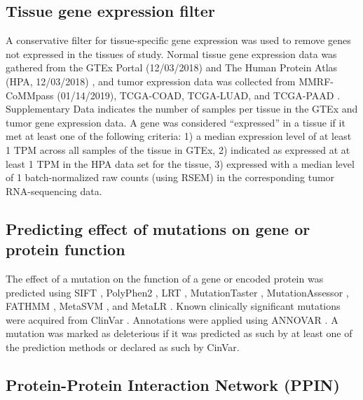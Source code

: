 \documentclass[english, 10pt, letterpaper]{article}
\begin{document}
\subsection*{Tissue gene expression filter}

A conservative filter for tissue-specific gene expression was used to remove genes not expressed in the tissues of study. 
Normal tissue gene expression data was gathered from the GTEx Portal (12/03/2018) \cite{GTExConsortium2017} and The Human Protein Atlas (HPA, 12/03/2018) \cite{Uhlen2015, Uhlen2016}, and tumor expression data was collected from MMRF-CoMMpass (01/14/2019), TCGA-COAD, TCGA-LUAD, and TCGA-PAAD \cite{Walker2019AAnalysis., CancerGenomeAtlasNetwork2012, CancerGenomeAtlasResearchNetwork2014, CancerGenomeAtlasResearchNetwork.Electronicaddress:andrew_aguirredfci.harvard.edu2017}. 
Supplementary Data indicates the number of samples per tissue in the GTEx and tumor gene expression data.
A gene was considered “expressed” in a tissue if it met at least one of the following criteria: 1) a median expression level of at least 1 TPM across all samples of the tissue in GTEx, 2) indicated as expressed at at least 1 TPM in the HPA data set for the tissue, 3) expressed with a median level of 1 batch-normalized raw counts (using RSEM) in the corresponding tumor RNA-sequencing data.


\subsection*{Predicting effect of mutations on gene or protein function}

The effect of a mutation on the function of a gene or encoded protein was predicted using SIFT \cite{Kumar2009, Vaser2016}, PolyPhen2 \cite{Adzhubei2010}, LRT \cite{Chun2009IdentificationGenomes.}, MutationTaster \cite{Schwarz2014MutationTaster2:Age.}, MutationAssessor \cite{Reva2007DeterminantsOptimization., Reva2011}, FATHMM \cite{Shihab2013}, MetaSVM \cite{Dong2015ComparisonStudies.}, and MetaLR \cite{Dong2015ComparisonStudies.}.
Known clinically significant mutations were acquired from ClinVar \cite{Landrum2018ClinVar:Evidence.}.
Annotations were applied using ANNOVAR \cite{Wang2010ANNOVAR:Data.}.
A mutation was marked as deleterious if it was predicted as such by at least one of the prediction methods or declared as such by CinVar.


\subsection*{Protein-Protein Interaction Network (PPIN)}
\end{document}
